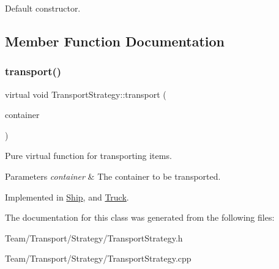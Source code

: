 Default constructor. 

\subsection{Member Function Documentation}
\mbox{\label{classTransportStrategy_ab5659f9d5d352ba0a23f1e99edd3d488}} 
\subsubsection{\texorpdfstring{transport()}{transport()}}
{\footnotesize\ttfamily virtual void Transport\+Strategy\+::transport (\begin{DoxyParamCaption}\item[{\hyperlink{classContainer}{Container} $\ast$}]{container }\end{DoxyParamCaption})\hspace{0.3cm}{\ttfamily [pure virtual]}}

Pure virtual function for transporting items. 
\begin{DoxyParams}{Parameters}
{\em container} & The container to be transported. \\
\hline
\end{DoxyParams}


Implemented in \hyperlink{classShip_a8b60ca34490dd8ef1c93888fa61c9472}{Ship}, and \hyperlink{classTruck_a260ad20acea80d5b4faa2a9d97eaa8e9}{Truck}.



The documentation for this class was generated from the following files\+:\begin{DoxyCompactItemize}
\item 
Team/\+Transport/\+Strategy/Transport\+Strategy.\+h\item 
Team/\+Transport/\+Strategy/Transport\+Strategy.\+cpp\end{DoxyCompactItemize}
